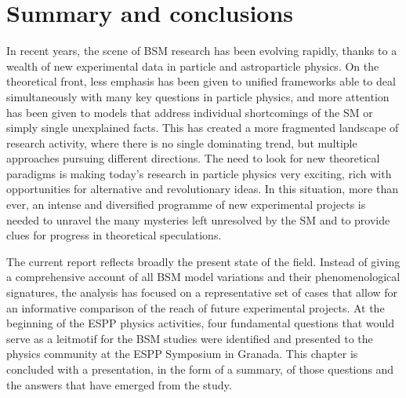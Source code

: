 \documentclass[../report.tex]{subfiles}
\begin{document}

\def\circa#1{\,\raise.3ex\hbox{$#1$\kern-.75em\lower1ex\hbox{$\sim$}}\,}

\section{Summary and conclusions}
\label{sec:BSM-Conclusions}

In recent years, the scene of BSM research has been evolving rapidly, thanks to a wealth of new experimental data in particle and astroparticle physics. On the theoretical front, less emphasis has been given to unified frameworks able to deal simultaneously with many key questions in particle physics, and more attention has been given to models that address individual shortcomings of the SM or simply single unexplained facts. This has created a more fragmented landscape of research activity, where there is no single dominating trend, but multiple approaches pursuing different directions. The need to look for new theoretical paradigms is making today's research in particle physics very exciting, rich with opportunities for alternative and revolutionary ideas. In this situation, more than ever, an intense and diversified programme of new experimental projects is needed to unravel the many mysteries left unresolved by the SM and to provide clues for progress in theoretical speculations.

The current report reflects broadly the present state of the field. Instead of giving a comprehensive account of all BSM model variations and their phenomenological signatures, the analysis has focused on a representative set of cases that allow for an informative comparison of the reach of future experimental projects. At the beginning of the ESPP physics activities, four fundamental questions that would serve as a leitmotif for the BSM studies were identified and presented to the physics community at the ESPP Symposium in Granada. This chapter is concluded with a presentation, in the form of a summary, of those questions and the answers that have emerged from the  study.

\medskip
{}
\end{document}
